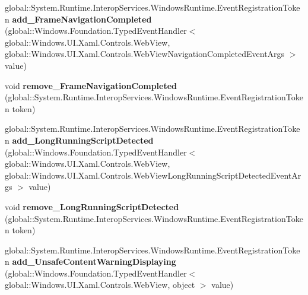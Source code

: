 \begin{DoxyCompactItemize}
global\+::\+System.\+Runtime.\+Interop\+Services.\+Windows\+Runtime.\+Event\+Registration\+Token {\bfseries add\+\_\+\+Frame\+Navigation\+Completed} (global\+::\+Windows.\+Foundation.\+Typed\+Event\+Handler$<$ global\+::\+Windows.\+U\+I.\+Xaml.\+Controls.\+Web\+View, global\+::\+Windows.\+U\+I.\+Xaml.\+Controls.\+Web\+View\+Navigation\+Completed\+Event\+Args $>$ value)
\item 
\mbox{\label{class_windows_1_1_u_i_1_1_xaml_1_1_controls_1_1_web_view_a9853678439b6dfd46c6d1f50ff1dd0bf}} 
void {\bfseries remove\+\_\+\+Frame\+Navigation\+Completed} (global\+::\+System.\+Runtime.\+Interop\+Services.\+Windows\+Runtime.\+Event\+Registration\+Token token)
\item 
\mbox{\label{class_windows_1_1_u_i_1_1_xaml_1_1_controls_1_1_web_view_ad58c8f3c8878bd833da8e7fa48d69ef7}} 
global\+::\+System.\+Runtime.\+Interop\+Services.\+Windows\+Runtime.\+Event\+Registration\+Token {\bfseries add\+\_\+\+Long\+Running\+Script\+Detected} (global\+::\+Windows.\+Foundation.\+Typed\+Event\+Handler$<$ global\+::\+Windows.\+U\+I.\+Xaml.\+Controls.\+Web\+View, global\+::\+Windows.\+U\+I.\+Xaml.\+Controls.\+Web\+View\+Long\+Running\+Script\+Detected\+Event\+Args $>$ value)
\item 
\mbox{\label{class_windows_1_1_u_i_1_1_xaml_1_1_controls_1_1_web_view_a0f9c05748c21f4e04127985a453270ed}} 
void {\bfseries remove\+\_\+\+Long\+Running\+Script\+Detected} (global\+::\+System.\+Runtime.\+Interop\+Services.\+Windows\+Runtime.\+Event\+Registration\+Token token)
\item 
\mbox{\label{class_windows_1_1_u_i_1_1_xaml_1_1_controls_1_1_web_view_ad45a2ce04326f24a39cb76343dfec113}} 
global\+::\+System.\+Runtime.\+Interop\+Services.\+Windows\+Runtime.\+Event\+Registration\+Token {\bfseries add\+\_\+\+Unsafe\+Content\+Warning\+Displaying} (global\+::\+Windows.\+Foundation.\+Typed\+Event\+Handler$<$ global\+::\+Windows.\+U\+I.\+Xaml.\+Controls.\+Web\+View, object $>$ value)
\item 
\mbox{\label{class_windows_1_1_u_i_1_1_xaml_1_1_controls_1_1_web_view_acc614a48549dc9f34c41f49f6c04aa17}} 

\end{DoxyCompactItemize}
